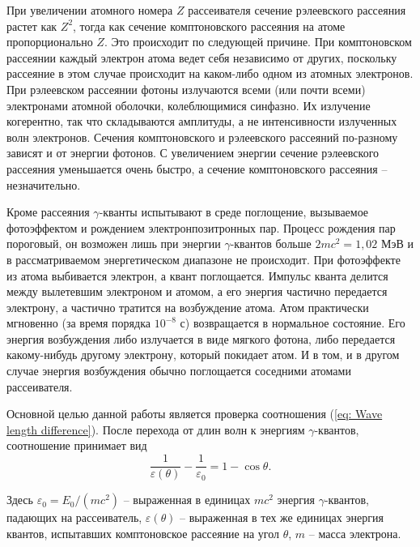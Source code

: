 \documentclass[a4paper,12pt]{article}
\begin{document}
При увеличении атомного номера $Z$ рассеивателя сечение рэлеевского рассеяния растет как $Z^2$, тогда как сечение комптоновского рассеяния на атоме пропорционально $Z$. Это происходит по следующей причине. При комптоновском рассеянии каждый электрон атома ведет себя независимо от других, поскольку рассеяние в
этом случае происходит на каком-либо одном из атомных электронов. При рэлеевском рассеянии фотоны излучаются всеми (или почти всеми) электронами атомной оболочки, колеблющимися синфазно. Их излучение когерентно, так что складываются амплитуды, а не интенсивности излученных волн электронов. Сечения комптоновского и рэлеевского рассеяний по-разному зависят и от энергии фотонов. С увеличением энергии сечение рэлеевского рассеяния уменьшается очень быстро, а сечение комптоновского рассеяния -- незначительно.

Кроме рассеяния $\gamma$-кванты испытывают в среде поглощение, вызываемое фотоэффектом и рождением электронпозитронных пар. Процесс рождения пар пороговый, он возможен лишь при энергии $\gamma$-квантов больше $2mc^2 = 1,02$ МэВ и в рассматриваемом энергетическом диапазоне не происходит. При фотоэффекте из атома выбивается электрон, а квант поглощается. Импульс кванта делится между вылетевшим электроном и атомом, а его энергия частично передается электрону, а частично тратится на возбуждение атома. Атом
практически мгновенно (за время порядка $10^{-8}$ с) возвращается в нормальное состояние. Его энергия возбуждения либо излучается в виде мягкого фотона, либо передается какому-нибудь другому электрону, который покидает атом. И в том, и в другом случае энергия возбуждения обычно поглощается соседними атомами рассеивателя.

Основной целью данной работы является проверка соотношения (\ref{eq: Wave length difference}). После перехода от длин волн к энергиям $\gamma$-квантов, соотношение принимает вид
\begin{equation}\label{eq: Energy difference}
    \frac{1}{\varepsilon(\theta)} - \frac{1}{\varepsilon_0} = 1 - \cos\theta.
\end{equation}

Здесь $\varepsilon_0 = E_0 / (mc^2)$ -- выраженная в единицах $mc^2$ энергия $\gamma$-квантов, падающих на рассеиватель, $\varepsilon(\theta)$ -- выраженная в тех же единицах энергия квантов, испытавших комптоновское рассеяние на угол $\theta$, $m$ -- масса электрона.
\end{document}

